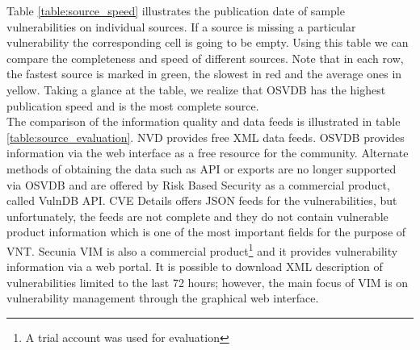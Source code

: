 Table \ref{table:source_speed} illustrates the publication date of sample vulnerabilities on individual sources. If a source is missing a particular vulnerability the corresponding cell is going to be empty. Using this table we can compare the completeness and speed of different sources. Note that in each row, the fastest source is marked in green, the slowest in red and the average ones in yellow. Taking a glance at the table, we realize that OSVDB has the highest publication speed and is the most complete source.
\\
The comparison of the information quality and data feeds is illustrated in table \ref{table:source_evaluation}. NVD provides free XML data feeds. OSVDB provides information via the web interface as a free resource for the community. Alternate methods of obtaining the data such as API or exports are no longer supported via OSVDB and are offered by Risk Based Security as a commercial product, called VulnDB API. CVE Details offers JSON feeds for the vulnerabilities, but unfortunately, the feeds are not complete and they do not contain vulnerable product information which is one of the most important fields for the purpose of VNT. Secunia VIM is also a commercial product\footnote{A trial account was used for evaluation} and it provides vulnerability information via a web portal. It is possible to download XML description of vulnerabilities limited to the last 72 hours; however, the main focus of VIM is on vulnerability management through the graphical web interface. 

